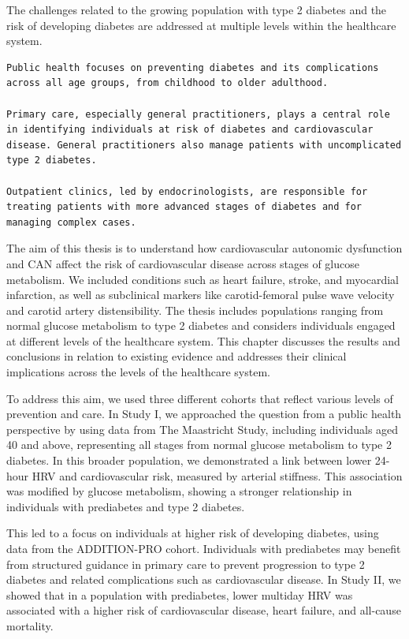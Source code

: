 \documentclass[
  a4paper,
  headsepline=true,
  open=any]{scrbook}
\begin{document}
The challenges related to the growing population with type 2 diabetes
and the risk of developing diabetes are addressed at multiple levels
within the healthcare system.

\begin{verbatim}
Public health focuses on preventing diabetes and its complications across all age groups, from childhood to older adulthood.

Primary care, especially general practitioners, plays a central role in identifying individuals at risk of diabetes and cardiovascular disease. General practitioners also manage patients with uncomplicated type 2 diabetes.

Outpatient clinics, led by endocrinologists, are responsible for treating patients with more advanced stages of diabetes and for managing complex cases.
\end{verbatim}

The aim of this thesis is to understand how cardiovascular autonomic
dysfunction and CAN affect the risk of cardiovascular disease across
stages of glucose metabolism. We included conditions such as heart
failure, stroke, and myocardial infarction, as well as subclinical
markers like carotid-femoral pulse wave velocity and carotid artery
distensibility. The thesis includes populations ranging from normal
glucose metabolism to type 2 diabetes and considers individuals engaged
at different levels of the healthcare system. This chapter discusses the
results and conclusions in relation to existing evidence and addresses
their clinical implications across the levels of the healthcare system.

To address this aim, we used three different cohorts that reflect
various levels of prevention and care. In Study I, we approached the
question from a public health perspective by using data from The
Maastricht Study, including individuals aged 40 and above, representing
all stages from normal glucose metabolism to type 2 diabetes. In this
broader population, we demonstrated a link between lower 24-hour HRV and
cardiovascular risk, measured by arterial stiffness. This association
was modified by glucose metabolism, showing a stronger relationship in
individuals with prediabetes and type 2 diabetes.

This led to a focus on individuals at higher risk of developing
diabetes, using data from the ADDITION-PRO cohort. Individuals with
prediabetes may benefit from structured guidance in primary care to
prevent progression to type 2 diabetes and related complications such as
cardiovascular disease. In Study II, we showed that in a population with
prediabetes, lower multiday HRV was associated with a higher risk of
cardiovascular disease, heart failure, and all-cause mortality.
\end{document}
